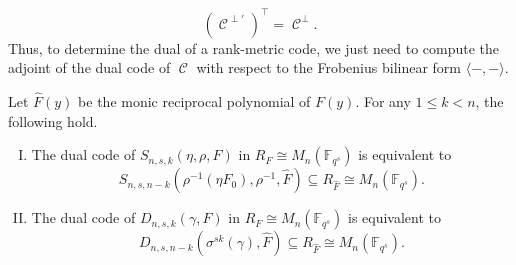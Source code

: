 \documentclass[10pt,a4paper]{amsart}
\DeclareMathOperator{\C}{\mathcal{C}}
\newcommand{\F}{{\mathbb F}}
\begin{document}
\begin{equation} \label{eq:relationduals}
(\C^{\perp'})^{\top} = \C^{\perp}.\end{equation} Thus, to determine the dual of a rank-metric code, we just need to compute the adjoint of the dual code of $\C$ with respect to the Frobenius bilinear form $\langle -,- \rangle$.

\begin{proposition} \label{prop:determinantiondual}
 Let $\hat{F}(y)$ be the monic reciprocal polynomial of $F(y)$. For any $1 \leq k<n$, the following hold. 

\begin{enumerate}[I)]
    \item\label{dualS} The dual code of $S_{n,s,k}(\eta,\rho,F)$ in $R_F \cong M_n(\F_{q^s})$ is equivalent to
 \[
 S_{n,s,n-k}(\rho^{-1}(\eta F_0), \rho^{-1},\hat{F}) \subseteq R_{\hat{F}} \cong M_n(\F_{q^s}).
 \]
 \item\label{dualD} The dual code of  $D_{n,s,k}(\gamma,F)$  in $R_F \cong M_n(\F_{q^s})$ is equivalent to
 \[D_{n,s,n-k}(\sigma^{sk}(\gamma),\hat{F}) \subseteq R_{\hat{F}} \cong M_n(\F_{q^s}).
 \]
 \end{enumerate}
\end{proposition}
\end{document}
